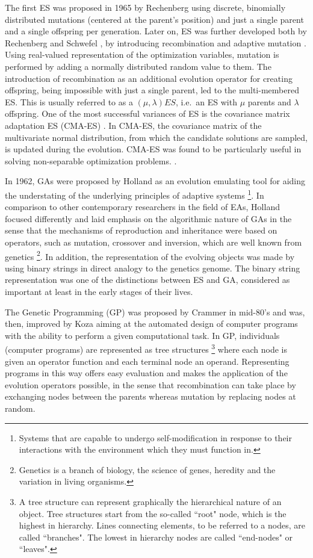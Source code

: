 The first ES was proposed in 1965 by Rechenberg \cite{Rechenberg_1965} using discrete, binomially distributed mutations (centered at the parent's position) and just a single parent and a single offspring per generation. Later on, ES was further developed both by Rechenberg \cite{Rechenberg71} and Schwefel \cite{Schwefel75}, by introducing recombination and adaptive mutation \cite{Rechenberg71}. Using real-valued representation of the optimization variables, mutation is performed by adding a normally distributed random value to them. The introduction of recombination as an additional evolution operator for creating offspring, being impossible with just a single parent, led to the multi-membered ES. This is usually referred to as a $(\mu, \lambda)ES$, i.e.\ an ES with $\mu$ parents and $\lambda$ offspring. One of the most successful variances of ES is the covariance matrix adaptation ES (CMA-ES) \cite{hansen2003ecj}. In CMA-ES, the covariance matrix of the multivariate normal distribution, from which the candidate solutions are sampled, is updated during the evolution. CMA-ES was found to be particularly useful in solving non-separable optimization problems. \cite{hansen2001ecj,hansen1997ecj}.

In 1962, GAs were proposed by Holland \cite{Holland:1962:OLT:321127.321128,holland_1975} as an evolution emulating tool for aiding the understating of the underlying principles of adaptive systems \footnote{Systems that are capable to undergo self-modification in response to their interactions with the environment which they must function in.}. In comparison to other contemporary researchers in the field of EAs, Holland focused differently and laid emphasis on the algorithmic nature of GAs in the sense that the mechanisms of reproduction and inheritance were based on operators, such as mutation, crossover and inversion, which are well known from genetics \footnote{Genetics is a branch of biology, the science of genes, heredity and the variation in living organisms.}. In addition, the representation of the evolving objects was made by using binary strings in direct analogy to the genetics genome. The binary string representation was one of the distinctions between ES and GA, considered as important at least in the early stages of their lives.  
 
The Genetic Programming (GP) was proposed by Crammer in mid-80's \cite{cramer85} and was, then, improved by Koza \cite{Koz94} aiming at the automated design of computer programs with the ability to perform a given computational task. In GP, individuals (computer programs) are represented as tree structures \footnote{A tree structure can represent graphically the hierarchical nature of an object. Tree structures start from the so-called ``root" node, which is the highest in hierarchy. Lines connecting elements, to be referred to a nodes, are called ``branches". The lowest in hierarchy nodes are called ``end-nodes" or ``leaves". } where each node is given an operator function and each terminal node an operand. Representing programs in this way offers easy evaluation and makes the application of the evolution operators possible, in the sense that recombination can take place by exchanging nodes between the parents whereas mutation by replacing nodes at random. 
 

